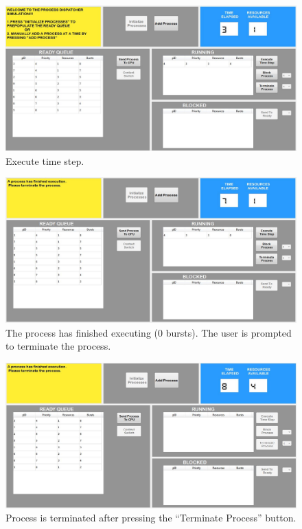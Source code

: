 \documentclass{article}
\begin{document}
\begin{figure}[H]
 \centering
 \includegraphics[height = 9 cm]{ss4.JPG}
 \caption{Execute time step.}
\end{figure}

\begin{figure}[H]
 \centering
 \includegraphics[height = 9 cm]{ss5.JPG}
 \caption{The process has finished executing (0 bursts). The user is prompted to terminate the process.}
\end{figure}

\begin{figure}[H]
 \centering
 \includegraphics[height = 9 cm]{ss6.JPG}
 \caption{Process is terminated after pressing the ``Terminate Process'' button.}
\end{figure}
\end{document}

